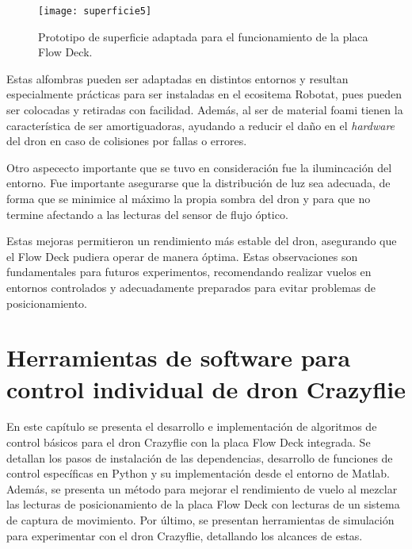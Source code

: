 \vspace{0.25cm}
\begin{figure}[htbp]
	\centering
	\texttt{[image: superficie5]}
	\caption{Prototipo de superficie adaptada para el funcionamiento de la placa Flow Deck.}
	\label{fig:Superficie_funcional_1}
\end{figure} 

Estas alfombras pueden ser adaptadas en distintos entornos y resultan especialmente prácticas para ser instaladas en el ecositema Robotat, pues pueden ser colocadas y retiradas con facilidad. Además, al ser de material foami tienen la característica de ser amortiguadoras, ayudando a reducir el daño en el \textit{hardware} del dron en caso de colisiones por fallas o errores.

Otro aspececto importante que se tuvo en consideración fue la ilumincación del entorno. Fue importante asegurarse que la distribución de luz sea adecuada, de forma que se minimice al máximo la propia sombra del dron y para que no termine afectando a las lecturas del sensor de flujo óptico.

Estas mejoras permitieron un rendimiento más estable del dron, asegurando que el Flow Deck pudiera operar de manera óptima. Estas observaciones son fundamentales para futuros experimentos, recomendando realizar vuelos en entornos controlados y adecuadamente preparados para evitar problemas de posicionamiento. 


\chapter{Herramientas de software para control individual de dron Crazyflie}
En este capítulo se presenta el desarrollo e implementación de algoritmos de control básicos para el dron Crazyflie con la placa Flow Deck integrada. Se detallan los pasos de instalación de las dependencias, desarrollo de funciones de control específicas en Python y su implementación desde el entorno de Matlab. Además, se presenta un método para mejorar el rendimiento de vuelo al mezclar las lecturas de posicionamiento de la placa Flow Deck con lecturas de un sistema de captura de movimiento. Por último, se presentan herramientas de simulación para experimentar con el dron Crazyflie, detallando los alcances de estas. 


